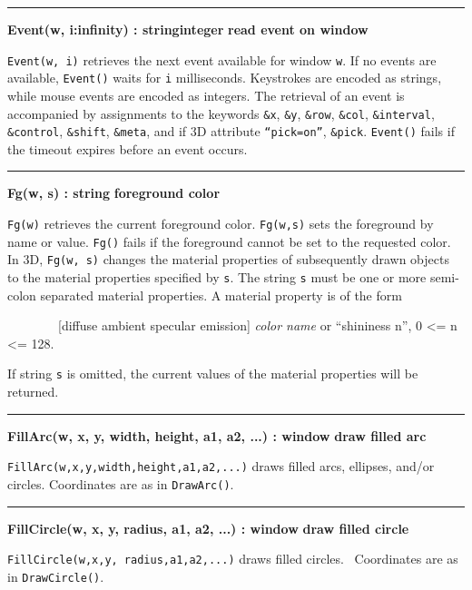 \bigskip\hrule\vspace{0.1cm}
\noindent
{\bf Event(w, i:infinity) : string{\textbar}integer } \hfill {\bf  read event on window}

\noindent
\texttt{Event(w, i)} retrieves the next event available for window
\texttt{w}. If no events are available, \texttt{Event()} waits for
\texttt{i} milliseconds. Keystrokes are encoded as strings, while mouse
events are encoded as integers. The retrieval of an event is
accompanied by assignments to the keywords \texttt{\&x}, \texttt{\&y},
\texttt{\&row}, \texttt{\&col}, \texttt{\&interval},
\texttt{\&control}, \texttt{\&shift}, \texttt{\&meta}, and if 3D
attribute \texttt{{\textquotedblleft}pick=on{\textquotedblright}},
\texttt{\&pick}. \texttt{Event()} fails if the timeout expires before
an event occurs.

\bigskip\hrule\vspace{0.1cm}
\noindent
{\bf Fg(w, s) : string } \hfill {\bf foreground color}

\noindent
\texttt{Fg(w)} retrieves the current foreground color. \texttt{Fg(w,s)}
sets the foreground by name or value. \texttt{Fg()} fails if the
foreground cannot be set to the requested color. In 3D,
\texttt{Fg(w, s)} changes the material properties of subsequently drawn objects
to the material properties specified by \texttt{s}. The string \texttt{s}
must be one or more semi-colon separated material properties. A
material property is of the form 

\ \ \ \ \ \ \ \ [diffuse {\textbar} ambient {\textbar} specular
{\textbar} emission] \textit{color name} or
{\textquotedblleft}shininess n{\textquotedblright}, 0 {\textless}= n
{\textless}= 128.

If string \texttt{s} is omitted, the current values of the material
properties will be returned.

\bigskip\hrule\vspace{0.1cm}
\noindent
{\bf FillArc(w, x, y, width, height, a1, a2, ...) : window } \hfill {\bf draw filled arc}

\noindent
\texttt{FillArc(w,x,y,width,height,a1,a2,...)} draws filled arcs,
ellipses, and/or circles. Coordinates are as in \texttt{DrawArc()}.

\bigskip\hrule\vspace{0.1cm}
\noindent
{\bf FillCircle(w, x, y, radius, a1, a2, ...) : window } \hfill {\bf draw filled circle}

\noindent
\texttt{FillCircle(w,x,y, radius,a1,a2,...)} draws filled circles.
\ Coordinates are as in \texttt{DrawCircle()}.

